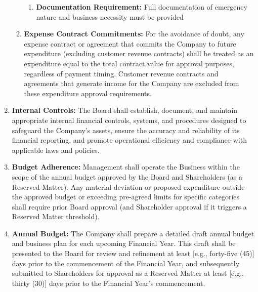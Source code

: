 \begin{enumerate}[label=(\alph*)]
\begin{enumerate}[label=(\roman*)]
\begin{enumerate}[label=(\alph*)]
    \item \textbf{Documentation Requirement:} Full documentation of emergency nature and business necessity must be provided
    \end{enumerate}
    \item \textbf{Expense Contract Commitments:} For the avoidance of doubt, any expense contract or agreement that commits the Company to future expenditure (excluding customer revenue contracts) shall be treated as an expenditure equal to the total contract value for approval purposes, regardless of payment timing. Customer revenue contracts and agreements that generate income for the Company are excluded from these expenditure approval requirements.
    \end{enumerate}
\item \textbf{Internal Controls:} The Board shall establish, document, and maintain appropriate internal financial controls, systems, and procedures designed to safeguard the Company's assets, ensure the accuracy and reliability of its financial reporting, and promote operational efficiency and compliance with applicable laws and policies.
\item \textbf{Budget Adherence:} Management shall operate the Business within the scope of the annual budget approved by the Board and Shareholders (as a Reserved Matter). Any material deviation or proposed expenditure outside the approved budget or exceeding pre-agreed limits for specific categories shall require prior Board approval (and Shareholder approval if it triggers a Reserved Matter threshold).
\item \textbf{Annual Budget:} The Company shall prepare a detailed draft annual budget and business plan for each upcoming Financial Year. This draft shall be presented to the Board for review and refinement at least [e.g., forty-five (45)] days prior to the commencement of the Financial Year, and subsequently submitted to Shareholders for approval as a Reserved Matter at least [e.g., thirty (30)] days prior to the Financial Year's commencement.
\end{enumerate}

